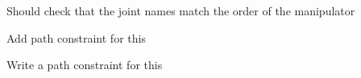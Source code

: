 \begin{DoxyRefList}
\label{todo__todo000025}%
%
Should check that the joint names match the order of the manipulator 

\label{todo__todo000024}%
%
Add path constraint for this 

\label{todo__todo000023}%
%
Write a path constraint for this 
\end{DoxyRefList}